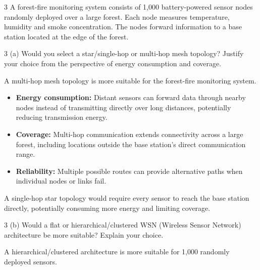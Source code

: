 
\begin{question}{3}
A forest-fire monitoring system consists of 1,000 battery-powered sensor nodes randomly deployed over a large
forest. Each node measures temperature, humidity and smoke concentration. The nodes forward information to a base
station located at the edge of the forest.
\end{question}

\begin{question}{3 (a)}
Would you select a star/single-hop or multi-hop mesh topology? Justify your choice from the perspective of energy
consumption and coverage.
\end{question}

A multi-hop mesh topology is more suitable for the forest-fire monitoring system.

\begin{itemize}
\item \textbf{Energy consumption:} Distant sensors can forward data through nearby nodes instead of transmitting
directly over long distances, potentially reducing transmission energy.
\item \textbf{Coverage:} Multi-hop communication extends connectivity across a large forest, including locations
outside the base station's direct communication range.
\item \textbf{Reliability:} Multiple possible routes can provide alternative paths when individual nodes or links
fail.
\end{itemize}

A single-hop star topology would require every sensor to reach the base station directly, potentially consuming
more energy and limiting coverage.

\begin{question}{3 (b)}
Would a flat or hierarchical/clustered WSN (Wireless Sensor Network) architecture be more suitable? Explain your
choice.
\end{question}

A hierarchical/clustered architecture is more suitable for 1,000 randomly deployed sensors.

